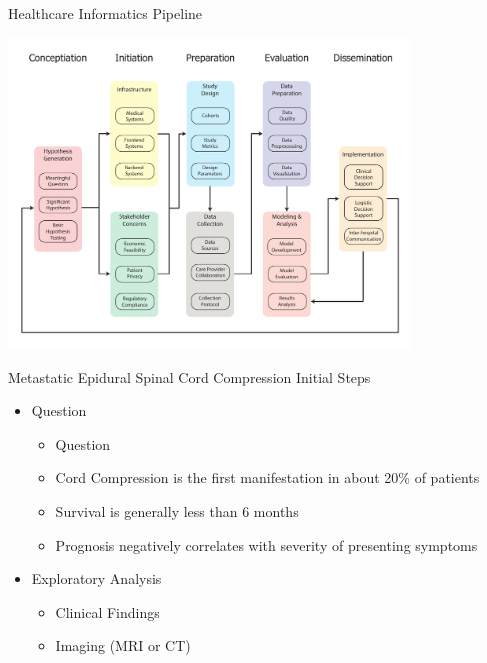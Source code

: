\documentclass[10pt]{beamer}
\begin{document}
\begin{frame}{Healthcare Informatics Pipeline}
	\begin{center}
		\includegraphics[width=0.8\textwidth]{images/informatics_pipeline.pdf}	
	\end{center}
\end{frame}








\begin{frame}{Metastatic Epidural Spinal Cord Compression}
Initial Steps
	\begin{itemize} %
		\item Question
		\begin{itemize}
			\item Question
			\item Cord Compression is the first manifestation in about 20\% of patients
			\item Survival is generally less than 6 months
			\item Prognosis negatively correlates with severity of presenting symptoms
		\end{itemize}
		\item Exploratory Analysis
		\begin{itemize}
			\item Clinical Findings
			\item Imaging (MRI or CT)
		\end{itemize}
	\end{itemize}
\end{frame}
\end{document}
